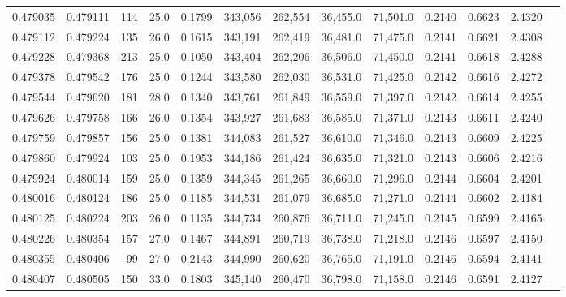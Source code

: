 \begin{tabular}{rrrrrrrrrrrrr}
0.479035 & 0.479111 &   114 & 25.0 &                                     0.1799 & 343,056 & 262,554 &  36,455.0 &  71,501.0 & 0.2140 & 0.6623 & 2.4320 \\
0.479112 & 0.479224 &   135 & 26.0 &                                     0.1615 & 343,191 & 262,419 &  36,481.0 &  71,475.0 & 0.2141 & 0.6621 & 2.4308 \\
0.479228 & 0.479368 &   213 & 25.0 &                                     0.1050 & 343,404 & 262,206 &  36,506.0 &  71,450.0 & 0.2141 & 0.6618 & 2.4288 \\
0.479378 & 0.479542 &   176 & 25.0 &                                     0.1244 & 343,580 & 262,030 &  36,531.0 &  71,425.0 & 0.2142 & 0.6616 & 2.4272 \\
0.479544 & 0.479620 &   181 & 28.0 &                                     0.1340 & 343,761 & 261,849 &  36,559.0 &  71,397.0 & 0.2142 & 0.6614 & 2.4255 \\
0.479626 & 0.479758 &   166 & 26.0 &                                     0.1354 & 343,927 & 261,683 &  36,585.0 &  71,371.0 & 0.2143 & 0.6611 & 2.4240 \\
0.479759 & 0.479857 &   156 & 25.0 &                                     0.1381 & 344,083 & 261,527 &  36,610.0 &  71,346.0 & 0.2143 & 0.6609 & 2.4225 \\
0.479860 & 0.479924 &   103 & 25.0 &                                     0.1953 & 344,186 & 261,424 &  36,635.0 &  71,321.0 & 0.2143 & 0.6606 & 2.4216 \\
0.479924 & 0.480014 &   159 & 25.0 &                                     0.1359 & 344,345 & 261,265 &  36,660.0 &  71,296.0 & 0.2144 & 0.6604 & 2.4201 \\
0.480016 & 0.480124 &   186 & 25.0 &                                     0.1185 & 344,531 & 261,079 &  36,685.0 &  71,271.0 & 0.2144 & 0.6602 & 2.4184 \\
0.480125 & 0.480224 &   203 & 26.0 &                                     0.1135 & 344,734 & 260,876 &  36,711.0 &  71,245.0 & 0.2145 & 0.6599 & 2.4165 \\
0.480226 & 0.480354 &   157 & 27.0 &                                     0.1467 & 344,891 & 260,719 &  36,738.0 &  71,218.0 & 0.2146 & 0.6597 & 2.4150 \\
0.480355 & 0.480406 &    99 & 27.0 &                                     0.2143 & 344,990 & 260,620 &  36,765.0 &  71,191.0 & 0.2146 & 0.6594 & 2.4141 \\
0.480407 & 0.480505 &   150 & 33.0 &                                     0.1803 & 345,140 & 260,470 &  36,798.0 &  71,158.0 & 0.2146 & 0.6591 & 2.4127 \\

\end{tabular}
